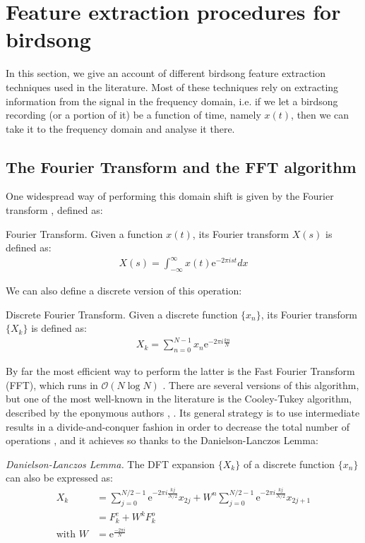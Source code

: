 \documentclass[../main.tex]{subfiles}
\begin{document}
\section{Feature extraction procedures for birdsong} \label{features_review}
In this section, we give an account of different birdsong feature extraction techniques used in the literature. Most of these techniques rely on extracting information from the signal in the frequency domain, i.e. if we let a birdsong recording (or a portion of it) be a function of time, namely $x(t)$, then we can take it to the frequency domain and analyse it there. 
\subsection{The Fourier Transform and the FFT algorithm} \label{subsection_fft}
\par One widespread way of performing this domain shift is given by the Fourier transform \cite{Weisstein2015}, defined as:
\theoremstyle{definition}
\begin{definition}{Fourier Transform}.
Given a function $x(t)$, its Fourier transform $X(s)$ is defined as:
\begin{align*}
X(s) = \int_{-\infty}^{\infty}x(t)\mathrm{e}^{-2\pi ist}dx
\end{align*}
\end{definition}
\par We can also define a discrete version of this operation:
\begin{definition}{Discrete Fourier Transform}.
Given a discrete function $\{x_n\}$, its Fourier transform $\{X_k\}$ is defined as:
\begin{align*}
X_k = \sum_{n=0}^{N-1}x_n\mathrm{e}^{-2\pi i\frac{kn}{N}}
\end{align*}
\end{definition}
\par By far the most efficient way to perform the latter is the Fast Fourier Transform (FFT), which runs in $\mathcal{O}(N\log{N})$ \cite{Smith2011}. There are several versions of this algorithm, but one of the most well-known in the literature is the Cooley-Tukey algorithm, described by the eponymous authors \cite{Cooley1965}, \cite{Weisstein2015}. Its general strategy is to use intermediate results in a divide-and-conquer fashion in order to decrease the total number of operations \cite{Weisstein2015}, and it achieves so thanks to the Danielson-Lanczos Lemma:
\begin{lemma}
\emph{Danielson-Lanczos Lemma.} The DFT expansion $\{X_k\}$ of a discrete function $\{x_n\}$ can also be expressed as:\\
\begin{align*}
X_k &= \sum_{j=0}^{N/2-1}\mathrm{e}^{-2\pi i\frac{kj}{N/2}}x_{2j} + W^n\sum_{j=0}^{N/2-1}\mathrm{e}^{-2\pi i\frac{kj}{N/2}}x_{2j+1}\\
&=F^e_k + W^kF^o_k \\
\text{with } W &= \mathrm{e}^ {\frac{-2\pi i}{N} }
\end{align*}
\end{lemma}
\end{document}
